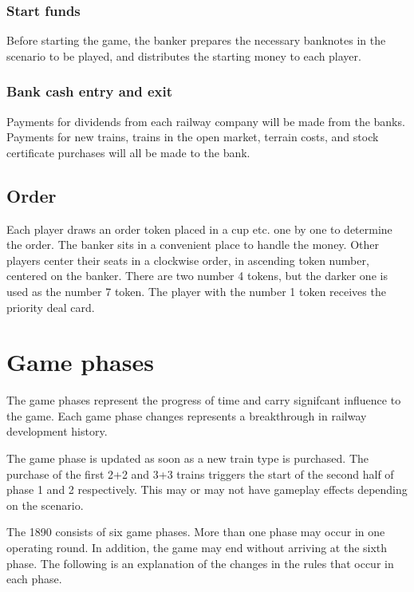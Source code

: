 \documentclass{article}
\begin{document}
\begin{CJK}{UTF8}{min}
\begin{multicols}{2}
\subsubsection{Start funds}

Before starting the game, the banker prepares the necessary banknotes
in the scenario to be played, and distributes the starting money to each player.

\subsubsection{Bank cash entry and exit}

Payments for dividends from each railway company will be made from the
banks. Payments for new trains, trains in the open market, terrain
costs, and stock certificate purchases will all be made to the bank.

\subsection{Order}

Each player draws an order token placed in a cup etc. one by one to
determine the order. The banker sits in a convenient place to handle
the money. Other players center their seats in a clockwise order, in
ascending token number, centered on the banker. There are two number 4
tokens, but the darker one is used as the number 7 token. The player
with the number 1 token receives the priority deal card.


\section{Game phases} \label{sec:game-phases}

The game phases represent the progress of time and carry signifcant
influence to the game. Each game phase changes represents a
breakthrough in railway development history.

The game phase is updated as soon as a new train type is purchased.
The purchase of the first 2+2 and 3+3 trains triggers the start of the
second half of phase 1 and 2 respectively. This may or may not have
gameplay effects depending on the scenario.

The 1890 consists of six game phases. More than one phase may occur in
one operating round. In addition, the game may end without arriving at
the sixth phase. The following is an explanation of the changes in the
rules that occur in each phase.


\end{multicols}
\end{CJK}
\end{document}
